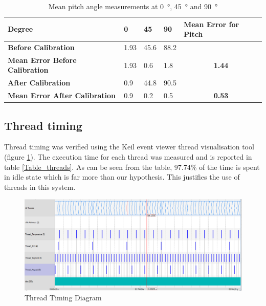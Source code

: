 \documentclass[12pt]{article}
\begin{document}
\begin{table}[!h]
\centering
\caption{Mean pitch angle measurements at \SI{0}{\degree}, \SI{45}{\degree} and \SI{90}{\degree}}
\label{Table_acc_pitch}
\begin{tabular}{lllll}
\hline
\textbf{Degree} & \textbf{0} & \textbf{45} & \textbf{90} & \textbf{Mean Error for Pitch}
\\ \hline
\textbf{Before Calibration} & 1.93 & 45.6 & 88.2
\\ \hline
\textbf{Mean Error Before Calibration} & 1.93 & 0.6 & 1.8 & \multicolumn{1}{c}{\textbf{1.44}}
\\ \hline
\textbf{After Calibration} & 0.9 & 44.8 & 90.5
\\ \hline
\textbf{Mean Error After Calibration} & 0.9 & 0.2 & 0.5 & \multicolumn{1}{c}{\textbf{0.53}}
\end{tabular}
\end{table}

\subsection{Thread timing}
Thread timing was verified using the Keil event viewer thread visualisation tool (figure \ref{fig:threadstiming}). The execution time for each thread was measured and is reported in table \ref{Table_threads}. As can be seen from the table, 97.74\% of the time is spent in idle state which is far more than our hypothesis. This justifies the use of threads in this system.

\begin{figure}[!h]
 \centering
 \includegraphics[scale=0.50]{images/threads1.png}
 \caption{Thread Timing Diagram}
 \label{fig:threadstiming}
\end{figure}
\end{document}
